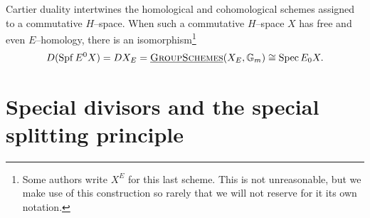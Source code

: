 \begin{remark}\label{TopologicalCartierDuality}
Cartier duality intertwines the homological and cohomological schemes assigned to a commutative \(H\)--space.  When such a commutative \(H\)--space \(X\) has free and even \(E\)--homology, there is an isomorphism\footnote{Some authors write \(X^E\) for this last scheme.  This is not unreasonable, but we make use of this construction so rarely that we will not reserve for it its own notation.} \[D(\operatorname{Spf} E^0 X) = DX_E = \operatorname{\underline{\smash{\normalfont\textsc{GroupSchemes}}}}(X_E, \mathbb G_m) \cong \operatorname{Spec} E_0 X.\]
\end{remark}












\section{Special divisors and the special splitting principle}\label{MSUDay}

